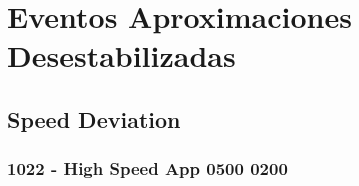 \documentclass[11pt,a4paper]{article}
\begin{document}

	\section{Eventos Aproximaciones Desestabilizadas}
	\subsection{Speed Deviation}
	\subsubsection{1022 - High Speed App 0500 0200}
	
\end{document}
